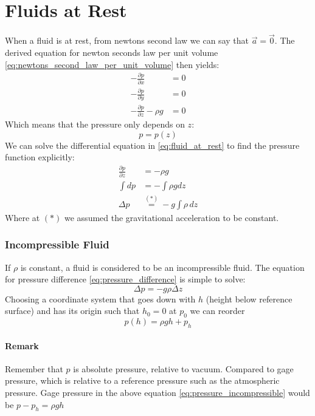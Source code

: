 \section{Fluids at Rest}
When a fluid is at rest, from newtons second law we can say that $\vec a = \vec 0$. The derived equation for newton seconds law per unit volume \eqref{eq:newtons_second_law_per_unit_volume} then yields:
\begin{equation}
	\begin{split}
		-\frac{\partial p}{\partial x} &= 0\\
		-\frac{\partial p}{\partial y} &= 0\\
		-\frac{\partial p}{\partial z}-\rho g &= 0
	\end{split}
	\label{eq:fluid_at_rest}
\end{equation}
Which means that the pressure only depends on $z$:
$$
p = p(z)
$$
We can solve the differential equation in \eqref{eq:fluid_at_rest} to find the pressure function explicitly:
\begin{equation}
	\begin{split}
		\frac{\partial p}{\partial z} &= -\rho g\\
		\int dp &= - \int \rho g dz\\
		\Delta p &\stackrel{(*)}{=} - g \int \rho\, dz
	\end{split}
	\label{eq:pressure_difference}
\end{equation}
Where at $(*)$ we assumed the gravitational acceleration to be constant.
\subsubsection{Incompressible Fluid}
If $\rho$ is constant, a fluid is considered to be an incompressible fluid. The equation for pressure difference \eqref{eq:pressure_difference} is simple to solve:
\begin{equation*}
	\Delta p = -g\rho \Delta z
\end{equation*}
Choosing a coordinate system that goes down with $h$ (height below reference surface) and has its origin such that $h_0=0$ at $p_0$ we can reorder
\begin{equation}
	\boxed{p(h)=\rho g h + p_h}
	\label{eq:pressure_incompressible}
\end{equation}
\paragraph{Remark}

Remember that $p$ is absolute pressure, relative to vacuum. Compared to gage pressure, which is relative to a reference pressure such as the atmospheric pressure. Gage pressure in the above equation \eqref{eq:pressure_incompressible} would be $p-p_h = \rho g h$
